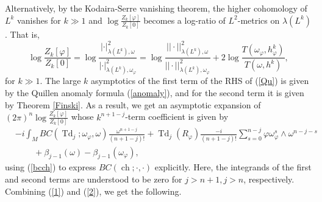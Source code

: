 \documentclass[12pt,reqno,a4paper]{amsart}
\numberwithin{equation}{section}
\def\b{\beta}
\DeclareMathOperator{\Td}{Td}
\DeclareMathOperator{\ch}{ch}
\theoremstyle{remark}
\theoremstyle{dotless}
\begin{document}
Alternatively, by the Kodaira-Serre vanishing theorem, the higher cohomology of $L^k$ vanishes for $k\gg1$ and $\log\frac{Z_k[\varphi]}{Z_k[0]}$ becomes a log-ratio of $L^2$-metrics on $\lambda(L^k)$. That is,
\begin{equation}\label{Qu}
\log\frac{Z_k[\varphi]}{Z_k[0]}=\log\frac{|\cdot|^2_{\lambda(L^k),\omega}}{|\cdot|^2_{\lambda(L^k),\omega_\varphi}}=\log\frac{||\cdot||^2_{\lambda(L^k),\omega}}{||\cdot||^2_{\lambda(L^k),\omega_\varphi}}+2\log \frac{T(\omega_\varphi,h^k_\varphi)}{T(\omega,h^k)},
\end{equation}
for $k\gg1$. The large $k$ asymptotics of the first term of the RHS of (\ref{Qu}) is given by the Quillen anomaly formula (\ref{anomaly}), and for the second term it is given by Theorem \ref{Finski}. As a result, we get an asymptotic expansion of $(2\pi)^n\log \frac{Z_k[\varphi]}{Z_k[0]}$ whose $k^{n+1-j}$-term coefficient is given by
\begin{align}\label{2}
&-i\int_M BC(\Td_j;\omega_\varphi,\omega)\frac{\omega^{n+1-j}}{(n+1-j)!}+\Td_{j}(R_\varphi)\frac{-i}{(n+1-j)!}\sum^{n-j}_{s=0}\varphi \omega_{\varphi}^s\wedge \omega^{n-j-s} \nonumber \\
&\qquad\, +\b_{j-1}(\omega)-\b_{j-1}(\omega_\varphi),
\end{align}
using (\ref{bcch}) to express $BC(\ch;\cdot,\cdot)$ explicitly. Here, the integrands of the first and second terms are understood to be zero for $j>n+1, j>n$, respectively. Combining (\ref{1}) and (\ref{2}), we get the following.
\end{document}
